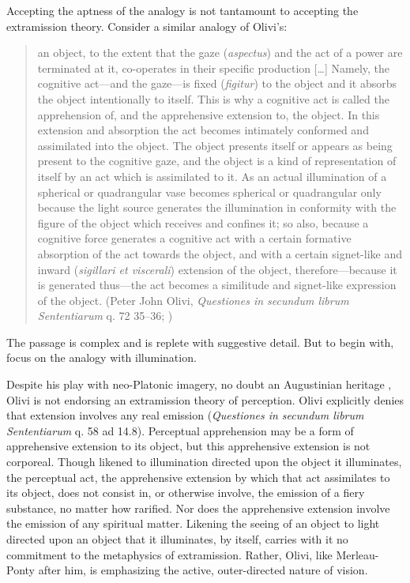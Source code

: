 Accepting the aptness of the analogy is not tantamount to accepting the extramission theory. Consider a similar analogy of Olivi's:
\begin{quote}
	an object, to the extent that the gaze (\emph{aspectus}) and the act of a power are terminated at it, co-operates in their specific production [\ldots] Namely, the cognitive act---and the gaze---is fixed (\emph{figitur}) to the object and it absorbs the object intentionally to itself. This is why a cognitive act is called the apprehension of, and the apprehensive extension to, the object. In this extension and absorption the act becomes intimately conformed and assimilated into the object. The object presents itself or appears as being present to the cognitive gaze, and the object is a kind of representation of itself by an act which is assimilated to it. As an actual illumination of a spherical or quadrangular vase becomes spherical or quadrangular only because the light source generates the illumination in conformity with the figure of the object which receives and confines it; so also, because a cognitive force generates a cognitive act with a certain formative absorption of the act towards the object, and with a certain signet-like and inward (\emph{sigillari et viscerali}) extension of the object, therefore---because it is generated thus---the act becomes a similitude and signet-like expression of the object. (Peter John Olivi, \emph{Questiones in secundum librum Sententiarum} q. 72 35--36; \citealt[146--147]{Toivanen:2013ul})
\end{quote}
The passage is complex and is replete with suggestive detail. But to begin with, focus on the analogy with illumination.

Despite his play with neo-Platonic imagery, no doubt an Augustinian heritage \citep[198]{Kent:1984zm}, Olivi is not endorsing an extramission theory of perception. Olivi explicitly denies that extension involves any real emission (\emph{Questiones in secundum librum Sententiarum} q. 58 ad 14.8). Perceptual apprehension may be a form of apprehensive extension to its object, but this apprehensive extension is not corporeal. Though likened to illumination directed upon the object it illuminates, the perceptual act, the apprehensive extension by which that act assimilates to its object, does not consist in, or otherwise involve, the emission of a fiery substance, no matter how rarified. Nor does the apprehensive extension involve the emission of any spiritual matter. Likening the seeing of an object to light directed upon an object that it illuminates, by itself, carries with it no commitment to the metaphysics of extramission. Rather, Olivi, like Merleau-Ponty after him, is emphasizing the active, outer-directed nature of vision.

